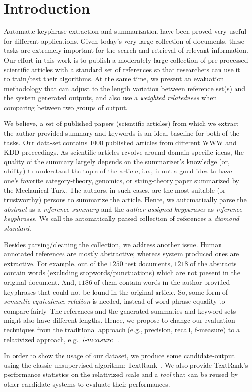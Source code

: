 \documentclass[a4paper]{report}
\begin{document}
\section{Introduction}
\par Automatic keyphrase extraction and summarization have been proved very useful for different applications. Given today's very large collection of documents, these tasks are extremely important for the search and retrieval of relevant information. Our effort in this work is to publish a moderately large collection of pre-processed scientific articles with a standard set of references so that researchers can use it to train/test their algorithms. At the same time, we present an evaluation methodology that can adjust to the length variation between reference set(s) and the system generated outputs, and also use a \emph{weighted relatedness} when comparing between two groups of output.
\par We believe, a set of published papers (scientific articles) from which we extract the author-provided summary and keywords is an ideal baseline  for both of the tasks. Our data-set contains $1000$ published articles from different WWW and KDD proceedings. As scientific articles revolve around domain specific ideas, the quality of the summary largely depends on the summarizer's knowledge (or, ability) to understand the topic of the article, i.e., is not a good idea to have one's favorite category-theory, genomics, or string-theory paper summarized by the Mechanical Turk.  The authors, in such cases, are the most suitable (or trustworthy) persons to summarize the article. Hence, we automatically parse the \emph{abstract} as a \emph{reference summary} and the \emph{author-assigned keyphrases} as \emph{reference keyphrases}. We call the automatically parsed collection of references a \emph{diamond standard}. 
\par Besides parsing/cleaning the collection, we address another issue. Human annotated references are mostly abstractive; whereas system produced ones are extractive. For example,  out of the $1250$ test documents,  $1218$ of the abstracts contain  words (excluding stopwords/punctuations) which are not present in the original document. And, $1186$ of them contain  words in the author-provided keyphrases that could not be found in the original article. So, some form of \emph{semantic equivalence relation} is needed, instead of word phrase equality to compare  fairly. The references and the generated summaries
and keyword sets might also have different lengths. 
Hence, we propose to change our evaluation techniques from the traditional approach 
(e.g., precision, recall, f-measure) to a relativized approach, e.g., $i\hbox{-}measure$~\cite{DBLP:conf/ecir/HamidHT16}. 
\par In order to show the usage of our dataset, we produce some candidate-output using the classic unsupervised algorithm: TextRank~\cite{Mihalcea04TextRank}. We also provide TextRank's performance statistics on the relativized scale and a \emph{tool} that can be reused by other candidate systems to evaluate their performances.
\end{document}
